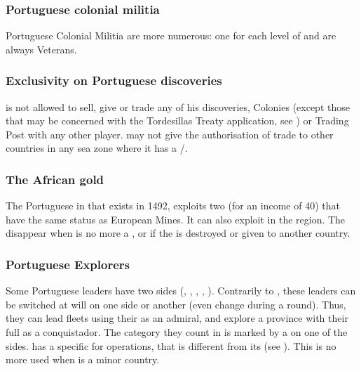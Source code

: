 \subsubsection{Portuguese colonial militia}
\aparag Portuguese Colonial Militia are more numerous: one \LDE for each
level of \COL and are always Veterans.

\subsubsection{Exclusivity on Portuguese discoveries}
\aparag \POR is not allowed to sell, give or trade any of his
discoveries, Colonies (except those that may be concerned with the
Tordesillas Treaty application, see ) or
Trading Post with any other player.
 \POR may not give the authorisation of trade
to other countries in any sea zone where it has a \COL/\TP.

\subsubsection{The African gold}\label{chSpecific:Portugal:African Gold}
 The Portuguese \TP
{} in  that exists in 1492,
exploits two  (for an income of 40\ducats) that have the
same status as European Mines. It can also exploit  in the
region. The  disappear when \POR is no more a \MAJ, or
if the \TP is destroyed or given to another country.

\subsubsection{Portuguese Explorers}
\aparag Some Portuguese leaders have two sides (,
, , ,
).
\bparag\label{chSpecific:Portugal:Explorers} Contrarily to , these leaders can be switched at will on one side or
another (even change during a round). Thus, they can lead fleets using
their \Man as an admiral, and explore a province with their full \Man as
a conquistador.
\bparag The category they count in is marked by a {\textetoile} on one
of the sides.
 \POR has a specific \FTI for \ROTW
operations, that is different from its \FTI (see ).
\bparag This \FTI is no more used when \POR is a minor country.


